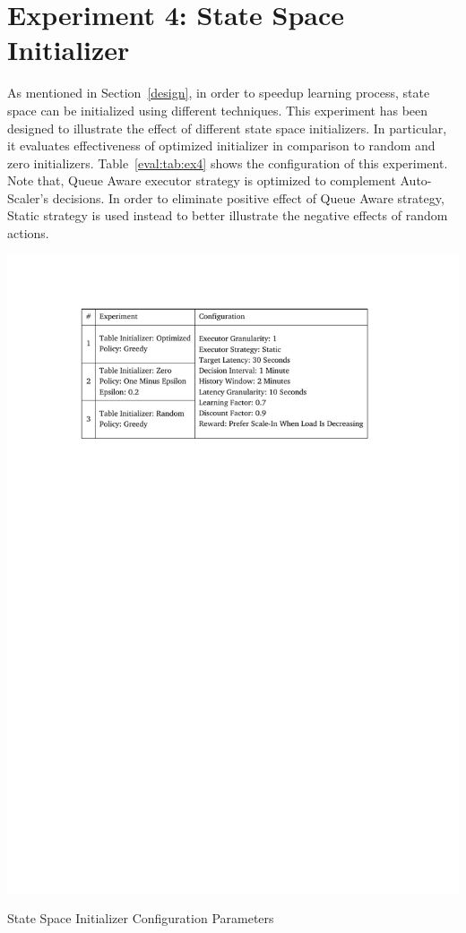 \clearpage
\section{Experiment 4: State Space Initializer}
As mentioned in Section~\ref{design}, in order to speedup learning process, state space can be initialized using different techniques. This experiment has been designed to illustrate the effect of different state space initializers. In particular, it evaluates effectiveness of optimized initializer in comparison to random and zero initializers. Table~\ref{eval:tab:ex4} shows the configuration of this experiment. Note that, Queue Aware executor strategy is optimized to complement Auto-Scaler's decisions. In order to eliminate positive effect of Queue Aware strategy, Static strategy is used instead to better illustrate the negative effects of random actions.
\begin{table}[h]
    \includegraphics[clip,trim=3.3cm 21.18cm 4.1cm 2.5cm]{tables/ex4.pdf}
    \centering
    \caption{State Space Initializer Configuration Parameters}
    \label{eval:tab:ex4}
\end{table}


